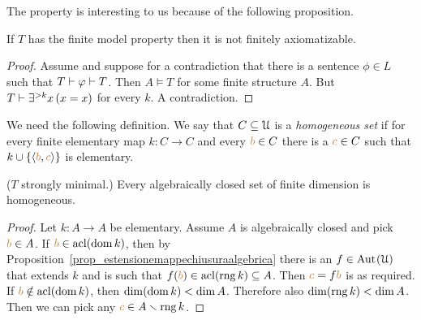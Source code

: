 
The property is interesting to us because of the following proposition.

\begin{proposition}\label{prop_fmp_fa}
If $T$ has the finite model property then it is not finitely axiomatizable.
\end{proposition}
\begin{proof}
Assume  and suppose for a contradiction that there is a sentence $\phi\in L$ such that $T\vdash\varphi\vdash T$.
Then $A\models T$ for some finite structure $A$.
But $T\vdash \exists^{>k}x\,(x=x)$ for every $k$.
A contradiction.
\end{proof}
We need the following definition.
We say that $C\subseteq\EuScript U$ is a \emph{homogeneous set\/} if for every finite elementary map $k:C\to C$ and every ${\color{brown} b}\in C$ there is a ${\color{brown} c}\in C$ such that $k\cup\{\langle{\color{brown}b},{\color{brown} c}\rangle\}$ is elementary.

\begin{proposition}\label{prop_zilbergiocattolo}
  ($T$ strongly minimal.)
  Every algebraically closed set of finite dimension is homogeneous.
\end{proposition}
\begin{proof}
  Let $k:A\to A$ be elementary.
  Assume $A$ is algebraically closed and pick ${\color{brown} b}\in A$.
  If ${\color{brown} b}\in{\rm acl}(\mathop{\rm dom} k)$, then by Proposition~\ref{prop_estensionemappechiusuraalgebrica} there is an $f\in{\rm Aut\kern.15ex}(\EuScript U)$ that extends $k$ and is such that $f({\color{brown} b})\in{\rm acl}(\mathop{\rm rng} k)\subseteq A$.
  Then ${\color{brown} c}=f{\color{brown} b}$ is as required.
  If ${\color{brown} b}\notin{\rm acl}(\mathop{\rm dom} k)$, then $\dim(\mathop{\rm dom} k)<\dim A$.
  Therefore also  $\dim(\mathop{\rm rng} k)<\dim A$.
  Then we can pick any ${\color{brown} c}\in A\smallsetminus\mathop{\rm rng} k$.
\end{proof}

